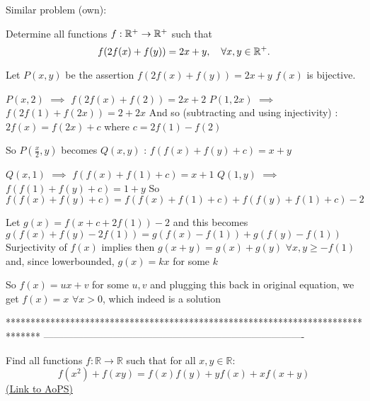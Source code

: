 \begin{solution}
	\begin{tcolorbox}Similar problem (own): 


Determine all functions $f: \Bbb{R}^+ \to \Bbb{R}^+$ such that \[f(2f(x) + f(y)) = 2x + y, \ \ \ \forall x,y\in \Bbb{R}^+.\]\end{tcolorbox}
Let $P(x,y)$ be the assertion $f(2f(x)+f(y))=2x+y$
$f(x)$ is bijective.

$P(x,2)$ $\implies$ $f(2f(x)+f(2))=2x+2$
$P(1,2x)$ $\implies$ $f(2f(1)+f(2x))=2+2x$
And so (subtracting and using injectivity) : $2f(x)=f(2x)+c$ where $c=2f(1)-f(2)$

So $P(\frac x2,y)$ becomes $Q(x,y)$ : $f(f(x)+f(y)+c)=x+y$

$Q(x,1)$ $\implies$ $f(f(x)+f(1)+c)=x+1$
$Q(1,y)$ $\implies$ $f(f(1)+f(y)+c)=1+y$
So $f(f(x)+f(y)+c)=f(f(x)+f(1)+c)+f(f(y)+f(1)+c)-2$

Let $g(x)=f(x+c+2f(1))-2$ and this becomes $g(f(x)+f(y)-2f(1))=g(f(x)-f(1))+g(f(y)-f(1))$
Surjectivity of $f(x)$ implies then $g(x+y)=g(x)+g(y)$ $\forall x,y\ge -f(1)$ and, since lowerbounded, $g(x)=kx$ for some $k$

So $f(x)=ux+v$ for some $u,v$ and plugging this back in original equation, we get $\boxed{f(x)=x}$ $\forall x>0$, which indeed is a solution
\end{solution}
*******************************************************************************
-------------------------------------------------------------------------------

\begin{problem}
	Find all functions $f:\mathbb{R} \rightarrow \mathbb{R}$ such that for all $x,y \in \mathbb{R}$:
\[ f(x^2)+f(xy)=f(x)f(y)+yf(x)+xf(x+y) \]
	\flushright \href{https://artofproblemsolving.com/community/c6h609426}{(Link to AoPS)}
\end{problem}



